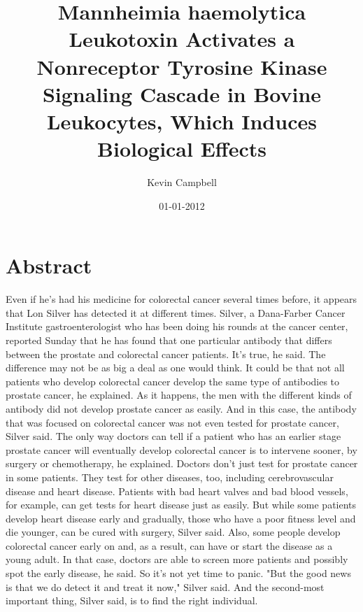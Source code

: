 \documentclass{article}%
\title{Mannheimia haemolytica Leukotoxin Activates a Nonreceptor Tyrosine Kinase Signaling Cascade in Bovine Leukocytes, Which Induces Biological Effects}%
\author{Kevin Campbell}%
\affil{Department of Medicine, Addenbrooke's Hospital, University of Cambridge, Cambridge, United Kingdom}%
\date{01{-}01{-}2012}%
\begin{document}
%
\normalsize%
\maketitle%
\section{Abstract}%
\label{sec:Abstract}%
Even if he's had his medicine for colorectal cancer several times before, it appears that Lon Silver has detected it at different times.\newline%
Silver, a Dana{-}Farber Cancer Institute gastroenterologist who has been doing his rounds at the cancer center, reported Sunday that he has found that one particular antibody that differs between the prostate and colorectal cancer patients.\newline%
It's true, he said.\newline%
The difference may not be as big a deal as one would think. It could be that not all patients who develop colorectal cancer develop the same type of antibodies to prostate cancer, he explained.\newline%
As it happens, the men with the different kinds of antibody did not develop prostate cancer as easily. And in this case, the antibody that was focused on colorectal cancer was not even tested for prostate cancer, Silver said. The only way doctors can tell if a patient who has an earlier stage prostate cancer will eventually develop colorectal cancer is to intervene sooner, by surgery or chemotherapy, he explained.\newline%
Doctors don't just test for prostate cancer in some patients.\newline%
They test for other diseases, too, including cerebrovascular disease and heart disease. Patients with bad heart valves and bad blood vessels, for example, can get tests for heart disease just as easily.\newline%
But while some patients develop heart disease early and gradually, those who have a poor fitness level and die younger, can be cured with surgery, Silver said.\newline%
Also, some people develop colorectal cancer early on and, as a result, can have or start the disease as a young adult. In that case, doctors are able to screen more patients and possibly spot the early disease, he said.\newline%
So it's not yet time to panic.\newline%
"But the good news is that we do detect it and treat it now," Silver said.\newline%
And the second{-}most important thing, Silver said, is to find the right individual.
\end{document}
